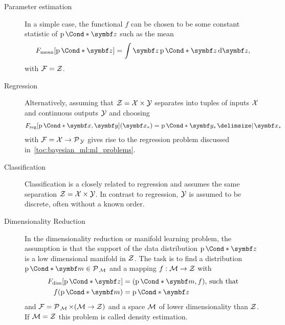 \begin{problem}
\begin{description}
    \item[Parameter estimation]
          In a simple case, the functional $f$ can be chosen to be some constant statistic of $\Prob*{\mat{z}}$ such as the mean
          \begin{align}
              F_{\text{mean}}[\Prob*{\mat{z}}] = \int \mat{z} \Prob*{\mat{z}} \diff \mat{z},
          \end{align}
          with $\mathcal{F} = \mathcal{Z}$.
    \item[Regression]
          Alternatively, assuming that $\mathcal{Z} = \mathcal{X} \times \mathcal{Y}$ separates into tuples of inputs $\mathcal{X}$ and continuous outputs $\mathcal{Y}$ and choosing
          \begin{align}
              \label{eq:bayesian_ml:f_reg}
              F_{\text{reg}}[\Prob*{\mat{x}, \mat{y}}](\mat{x}_\ast) = \Prob*{\mat{y}_\ast \given \mat{x}_\ast}
          \end{align}
          with $\mathcal{F} = \mathcal{X} \to \operatorname{\mathcal{P}\mkern2mu}_{\mathcal{Y}}$ gives rise to the regression problem discussed in~\cref{toc:bayesian_ml:ml_problems}.
    \item[Classification]
          Classification is a closely related to regression and assumes the same separation $\mathcal{Z} = \mathcal{X} \times \mathcal{Y}$.
          In contrast to regression, $\mathcal{Y}$ is assumed to be discrete, often without a known order.
    \item[Dimensionality Reduction]
          In the dimensionality reduction or manifold learning problem, the assumption is that the support of the data distribution $\Prob*{\mat{z}}$ is a low dimensional manifold in $\mathcal{Z}$.
          The task is to find a distribution $\Prob*{\mat{m}} \in \Probs{\Mc}$ and a mapping $f : \mathcal{M} \to \mathcal{Z}$ with
          \begin{equation}
              \begin{split}
                  F_{\text{dim}}[\Prob*{\mat{z}}] & = (\Prob*{\mat{m}}, f)\text{, such that} \\
                  f(\Prob*{\mat{m}})              & = \Prob*{\mat{z}}
              \end{split}
          \end{equation}
          and $\mathcal{F} = \operatorname{\mathcal{P}\mkern2mu}_{\mathcal{M}} \times (\mathcal{M} \to \mathcal{Z})$ and a space $\mathcal{M}$ of lower dimensionality than $\mathcal{Z}$.
          If $\mathcal{M} = \mathcal{Z}$ this problem is called density estimation.
\end{description}
\end{problem}

